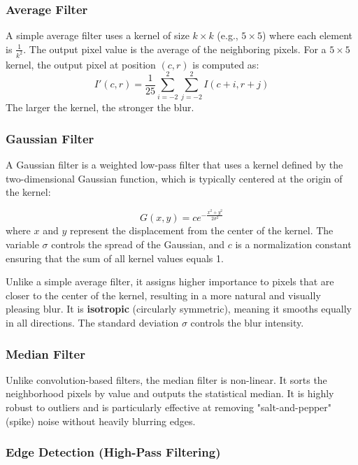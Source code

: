 \subsubsection*{Average Filter}
A simple average filter uses a kernel of size $k \times k$ (e.g., $5 \times 5$) where each element is $\frac{1}{k^2}$. 
The output pixel value is the average of the neighboring pixels. For a $5 \times 5$ kernel, the output pixel at position $(c,r)$ is computed as:
\begin{equation}
    I'(c,r) = \frac{1}{25} \sum_{i=-2}^{2} \sum_{j=-2}^{2} I(c+i, r+j)
\end{equation}
The larger the kernel, the stronger the blur. 

\subsubsection*{Gaussian Filter}
A Gaussian filter is a weighted low-pass filter that uses a kernel defined by the two-dimensional Gaussian function, 
which is typically centered at the origin of the kernel:

\begin{equation}
    G(x,y) = c e^{-\frac{x^2 + y^2}{2\sigma^2}}
\end{equation}
where $x$ and $y$ represent the displacement from the center of the kernel. The variable $\sigma$ controls the spread of the Gaussian, and $c$ is a normalization constant ensuring that the sum of all kernel values equals 1. 

Unlike a simple average filter, it assigns higher importance to pixels that are closer to the center of the kernel, resulting in a more natural and visually pleasing blur.
It is \textbf{isotropic} (circularly symmetric), meaning it smooths equally in all directions. The standard deviation $\sigma$ controls the blur intensity.

\subsubsection*{Median Filter}
Unlike convolution-based filters, the median filter is non-linear. 
It sorts the neighborhood pixels by value and outputs the statistical median. 
It is highly robust to outliers and is particularly effective at removing "salt-and-pepper" (spike) noise without heavily blurring edges.

\subsubsection{Edge Detection (High-Pass Filtering)}

